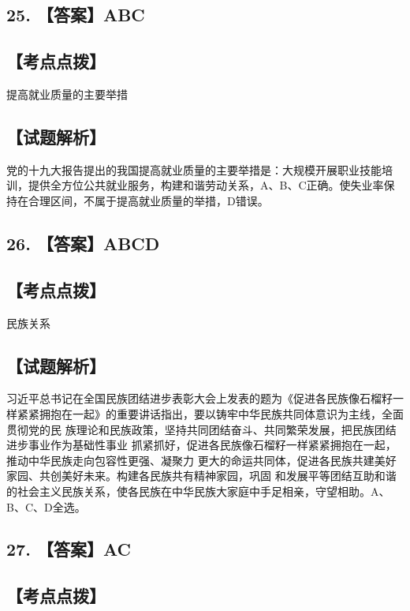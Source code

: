 \documentclass[UTF8,11pt]{ctexart}
\begin{document}
\subsection*{25. 【答案】ABC}

\subsection*{【考点点拨】}

提高就业质量的主要举措


\subsection*{【试题解析】}

党的十九大报告提出的我国提高就业质量的主要举措是：大规模开展职业技能培训，提供全方位公共就业服务，构建和谐劳动关系，A、B、C正确。使失业率保持在合理区间，不属于提高就业质量的举措，D错误。


\subsection*{26. 【答案】ABCD}

\subsection*{【考点点拨】}

民族关系


\subsection*{【试题解析】}

习近平总书记在全国民族团结进步表彰大会上发表的题为《促进各民族像石榴籽一 样紧紧拥抱在一起》的重要讲话指出，要以铸牢中华民族共同体意识为主线，全面贯彻党的民 族理论和民族政策，坚持共同团结奋斗、共同繁荣发展，把民族团结进步事业作为基础性事业 抓紧抓好，促进各民族像石榴籽一样紧紧拥抱在一起，推动中华民族走向包容性更强、凝聚力 更大的命运共同体，促进各民族共建美好家园、共创美好未来。构建各民族共有精神家园，巩固 和发展平等团结互助和谐的社会主义民族关系，使各民族在中华民族大家庭中手足相亲，守望相助。A、B、C、D全选。


\subsection*{27. 【答案】AC}

\subsection*{【考点点拨】}
\end{document}
